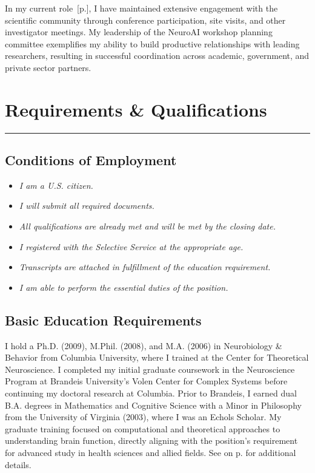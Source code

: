 \documentclass[10pt]{article}
\newcommand{\see}[1]{[\textcolor{hopkinsblue}{p.\pageref{sec:#1}}]}
\newcommand{\cf}[1]{\textcolor{hopkinsblue}{See \emph{\nameref{sec:#1}} on p.\pageref{sec:#1}}}
\newcommand{\newsection}[2]{%
  \section*{#1}
  \vspace{-.1in}
  \hrule
  \vspace{.2in}
  \label{sec:#2}
}
\begin{document}
In my current role~\see{jobobd}, I have maintained extensive engagement with
the scientific community through conference participation, site visits, and
other investigator meetings. My leadership of the NeuroAI workshop planning
committee exemplifies my ability to build productive relationships with leading
researchers, resulting in successful coordination across academic, government,
and private sector partners.



\newsection{Requirements \& Qualifications}{basicreqs}

\subsection*{Conditions of Employment}

\begin{itemize}
  \item \emph{I am a U.S. citizen.}
  \item \emph{I will submit all required documents.}
  \item \emph{All qualifications are already met and will be met by the closing date.}
  \item \emph{I registered with the Selective Service at the appropriate age.}
  \item \emph{Transcripts are attached in fulfillment of the education requirement.}
  \item \emph{I am able to perform the essential duties of the position.}
\end{itemize}

\subsection*{Basic Education Requirements}

I hold a Ph.D. (2009), M.Phil. (2008), and M.A. (2006) in Neurobiology \&
Behavior from Columbia University, where I trained at the Center for Theoretical
Neuroscience. I completed my initial graduate coursework in the Neuroscience
Program at Brandeis University's Volen Center for Complex Systems before
continuing my doctoral research at Columbia. Prior to Brandeis, I earned dual
B.A. degrees in Mathematics and Cognitive Science with a Minor in Philosophy
from the University of Virginia (2003), where I was an Echols Scholar. My
graduate training focused on computational and theoretical approaches to
understanding brain function, directly aligning with the position's requirement
for advanced study in health sciences and allied fields. \cf{education} for
additional details.
\end{document}
